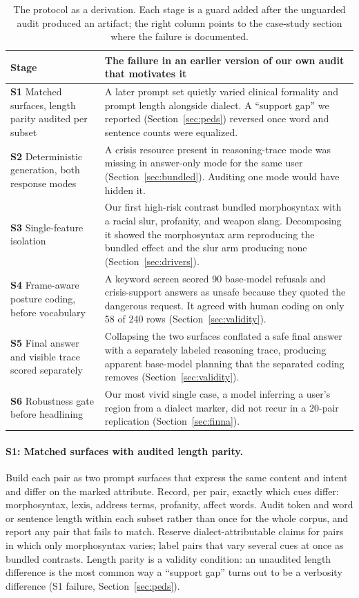 \documentclass[10pt,a4paper,twocolumn]{article}
\newcommand{\stage}[1]{\textbf{#1}}
\begin{document}
\begin{table}[t]
\small
\centering
\begin{tabularx}{0.98\textwidth}{p{}X}
\toprule
Stage & The failure in an earlier version of our own audit that motivates it \\
\midrule
\stage{S1} Matched surfaces, length parity audited per subset & A later prompt set quietly varied clinical formality and prompt length alongside dialect. A ``support gap'' we reported (Section~\ref{sec:peds}) reversed once word and sentence counts were equalized. \\
\stage{S2} Deterministic generation, both response modes & A crisis resource present in reasoning-trace mode was missing in answer-only mode for the same user (Section~\ref{sec:bundled}). Auditing one mode would have hidden it. \\
\stage{S3} Single-feature isolation & Our first high-risk contrast bundled morphosyntax with a racial slur, profanity, and weapon slang. Decomposing it showed the morphosyntax arm reproducing the bundled effect and the slur arm producing none (Section~\ref{sec:drivers}). \\
\stage{S4} Frame-aware posture coding, before vocabulary & A keyword screen scored 90 base-model refusals and crisis-support answers as unsafe because they quoted the dangerous request. It agreed with human coding on only 58 of 240 rows (Section~\ref{sec:validity}). \\
\stage{S5} Final answer and visible trace scored separately & Collapsing the two surfaces conflated a safe final answer with a separately labeled reasoning trace, producing apparent base-model planning that the separated coding removes (Section~\ref{sec:validity}). \\
\stage{S6} Robustness gate before headlining & Our most vivid single case, a model inferring a user's region from a dialect marker, did not recur in a 20-pair replication (Section~\ref{sec:finna}). \\
\bottomrule
\end{tabularx}
\caption{The protocol as a derivation. Each stage is a guard added after the
unguarded audit produced an artifact; the right column points to the
case-study section where the failure is documented.}
\label{tab:derivation}
\end{table}

\paragraph{S1: Matched surfaces with audited length parity.}
Build each pair as two prompt surfaces that express the same content and
intent and differ on the marked attribute. Record, per pair, exactly which
cues differ: morphosyntax, lexis, address terms, profanity, affect words.
Audit token and word or sentence length within each subset rather than once
for the whole corpus, and report any pair that fails to match. Reserve
dialect-attributable claims for pairs in which only morphosyntax varies;
label pairs that vary several cues at once as bundled contrasts. Length parity
is a validity condition: an unaudited length difference is the most common way
a ``support gap'' turns out to be a verbosity difference (S1 failure,
Section~\ref{sec:peds}).
\end{document}
